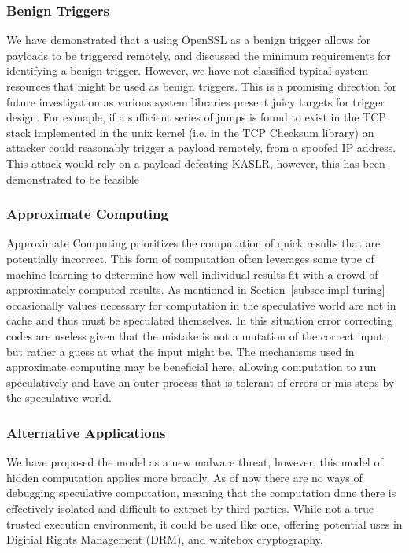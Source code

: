 \subsubsection{Benign Triggers}
We have demonstrated that a using OpenSSL as a benign trigger allows for
\speculake payloads to be triggered remotely, and discussed the minimum
requirements for identifying a benign trigger. However, we have not classified
typical system resources that might be used as benign triggers. This is a
promising direction for future investigation as various system libraries present
juicy targets for trigger design. For exmaple, if a sufficient series of jumps
is found to exist in the TCP stack implemented in the unix kernel (i.e. in the
TCP Checksum library) an attacker could reasonably trigger a \speculake payload
remotely, from a spoofed IP address. This attack would rely on a payload
defeating KASLR, however, this has been demonstrated to be
feasible~\cite{gruss2017kaslr,evtyushkin2016jump}

\subsubsection{Approximate Computing}
Approximate Computing prioritizes the computation of quick results that are
potentially incorrect. This form of computation often leverages some type of
machine learning to determine how well individual results fit with a crowd of
approximately computed results. As mentioned in Section~\ref{subsec:impl-turing}
occasionally values necessary for computation in the speculative world are not
in cache and thus must be speculated themselves. In this situation error
correcting codes are useless given that the mistake is not a mutation of the
correct input, but rather a guess at what the input might be. The mechanisms
used in approximate computing may be beneficial here, allowing computation to
run speculatively and have an outer process that is tolerant of errors or
mis-steps by the speculative world.



\subsubsection{Alternative Applications}
We have proposed the \speculake model as a new malware threat, however, this
model of hidden computation applies more broadly. As of now there are no ways of
debugging speculative computation, meaning that the computation done there is
effectively isolated and difficult to extract by third-parties. While not a true
trusted execution environment, it could be used like one, offering potential
uses in Digitial Rights Management (DRM), and whitebox cryptography.




